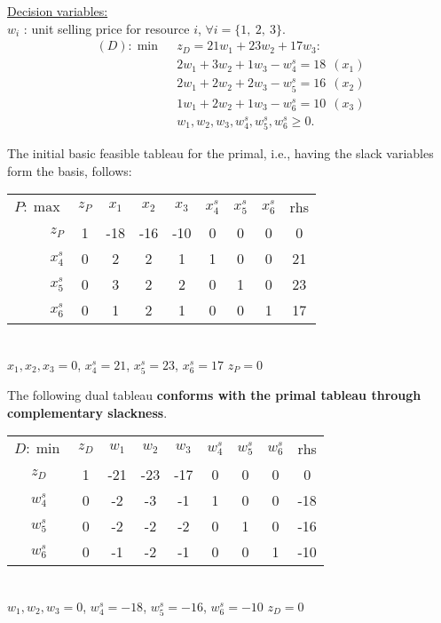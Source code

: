 \underline{Decision variables:} \\
$w_i$ : unit selling price for resource $i$, $\forall i = \{1,~2,~3\}$.
\begin{align*}
(D): \min~~ & z_D =21w_1 +23w_2 +17w_3:  \\
& 2w_1 +3w_2 + 1w_3 - w^{s}_4 = 18 ~~ (x_1) \\
& 2w_1 +2w_2 + 2w_3 - w^{s}_5 = 16 ~~ (x_2)\\
& 1w_1 +2w_2 + 1w_3 - w^{s}_6 = 10 ~~ (x_3)\\
& w_1, w_2, w_3, w^{s}_4, w^{s}_5, w^{s}_6 \ge 0. 
\end{align*}

The initial basic feasible tableau for the primal, i.e., having the slack variables form the basis, follows:

\begin{center} \begin{tabular} {r|c|c|c|c|c|c|c|c|} \cline{2-9} 
$P:\max$ & $z_P$ & $x_1$ & $x_2$ & $x_3$ & $x^s_4$ & $x^s_5$ & $x^s_6$ & rhs  \\ \cline{2-9}\cline{2-9} 
$z_P$	& 1  	& -18   & -16   & -10   & 0    	  & 0      	& 0       & 0   \\ \cline{2-9}  
$x^s_4$	& 0  	& 2     & 2     & 1     & 1    	  & 0      	& 0       & 21   \\ \cline{2-9} 
$x^s_5$	& 0  	& 3     & 2     & 2     & 0    	  & 1      	& 0       & 23   \\ \cline{2-9} 
$x^s_6$	& 0  	& 1     & 2     & 1     & 0    	  & 0      	& 1       & 17   \\ \cline{2-9}
\end{tabular} \\ \vspace{3mm} 
{$x_1, x_2, x_3=0$, $x^s_4=21$, $x^s_5=23$, $x^s_6=17$  $z_P=0$} \\ \end{center}
\vspace{4mm} The following dual tableau {\bf conforms with the primal tableau through complementary slackness}.\\
\begin{center} \begin{tabular} {c|c|c|c|c|c|c|c|c|} \cline{2-9} 
$D:\min$	& $z_D$ & $w_1$ & $w_2$ & $w_3$ & $w^s_4$ & $w^s_5$ & $w^s_6$ & rhs \\ \cline{2-9}\cline{2-9}  
$z_D$	& 1     & -21   & -23   & -17     	& 0    	& 0    	& 0     	& 0   	\\ \cline{2-9}  
$w^s_4$	& 0    	& -2    & -3    & -1     	& 1  		& 0  		& 0     	& -18   \\ \cline{2-9}   
$w^s_5$ & 0    	& -2    & -2    & -2     	& 0  		& 1   		& 0     	& -16   \\ \cline{2-9}   
$w^s_6$	& 0    	& -1    & -2    & -1   	& 0   		& 0  		& 1     	& -10    \\ \cline{2-9} 
\end{tabular} \\ \vspace{3mm} 
{$w_1, w_2, w_3=0$, $w^s_4=-18$, $w^s_5=-16$, $w^s_6=-10$  $z_D=0$} \\ \end{center}

